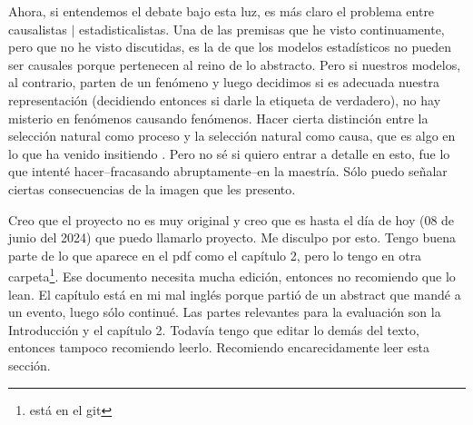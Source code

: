 Ahora, si entendemos el debate bajo esta luz, es más claro el problema entre causalistas $|$ estadisticalistas.
Una de las premisas que he visto continuamente, pero que no he visto discutidas, es la de que los modelos estadísticos no pueden ser causales porque pertenecen al reino de lo abstracto.
Pero si nuestros modelos, al contrario, parten de un fenómeno y luego decidimos si es adecuada nuestra representación (decidiendo entonces si darle la etiqueta de verdadero), no hay misterio en fenómenos causando fenómenos.
Hacer cierta distinción entre la selección natural como proceso y la selección natural como causa, que es algo en lo que ha venido insitiendo \textcite{Millstein2006, Millstein2002}.
Pero no sé si quiero entrar a detalle en esto, fue lo que intenté hacer--fracasando abruptamente--en la maestría.
Sólo puedo señalar ciertas consecuencias de la imagen que les presento.

Creo que el proyecto no es muy original y creo que es hasta el día de hoy (08 de junio del 2024) que puedo llamarlo proyecto.
Me disculpo por esto.
Tengo buena parte de lo que aparece en el pdf como el capítulo 2, pero lo tengo en otra carpeta\footnote{está en el git}.
Ese documento necesita mucha edición, entonces no recomiendo que lo lean.
El capítulo está en mi mal inglés porque partió de un abstract que mandé a un evento, luego sólo continué.
Las partes relevantes para la evaluación son la Introducción  y el capítulo 2.
Todavía tengo que editar lo demás del texto, entonces tampoco recomiendo leerlo.
Recomiendo encarecidamente leer esta sección.

